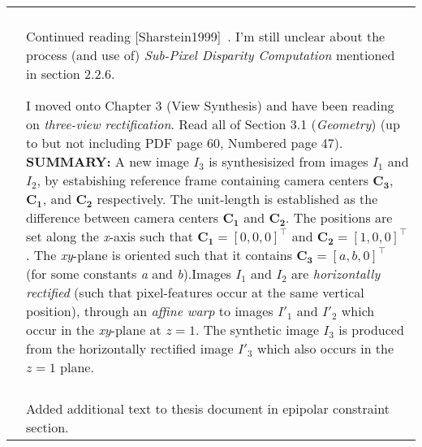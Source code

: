 \documentclass[a4paper,10pt]{article}
\newcommand{\logentry}[4]{\hline\\[-0.25ex]\selectlanguage{USenglish}\formatdate{#2}{#1}{#3}&{#4}\par\\[-0.25ex]}
\newcommand{\SUMMARY}[1]{%
	{\noindent\textbf{\color{blue}SUMMARY: }{\noindent #1} \noindent}
}
\begin{document}
\begin{longtable}{l p{12cm} }
{		}
	\logentry{6}{22}{2016}{%
Continued reading [Sharstein1999]~\cite{Scharstein1999}. I'm still unclear about the process (and use of) \textit{Sub-Pixel Disparity Computation} mentioned in section 2.2.6.\newline
\par I moved onto Chapter 3 (View Synthesis) and have been reading on \textit{three-view rectification}. Read all of Section 3.1 (\textit{Geometry}) (up to but not including PDF page 60, Numbered page 47). \SUMMARY{A new image $I_3$ is synthesisized from images $I_1$ and $I_2$, by estabishing reference frame containing camera centers $\mathbf{C_3}$, $\mathbf{C_1}$, and $\mathbf{C_2}$ respectively. The unit-length is established as the difference between camera centers $\mathbf{C_1}$ and $\mathbf{C_2}$. The positions are set along the \textit{x}-axis such that $\mathbf{C_1}=[0,0,0]^\top$ and $\mathbf{C_2}=[1,0,0]^\top$. The \textit{xy}-plane is oriented such that it contains $\mathbf{C_3}=[a,b,0]^\top$ (for some constants \textit{a} and \textit{b}).Images $I_1$ and $I_2$ are \textit{horizontally rectified} (such that pixel-features occur at the same vertical position), through an \textit{affine warp} to images $I'_1$ and $I'_2$ which occur in the \textit{xy}-plane at $z=1$. The synthetic image $I_3$ is produced from the horizontally rectified image $I'_3$ which also occurs in the $z=1$ plane.
}
	}
	\logentry{6}{24}{2016}{%
Added additional text to thesis document in epipolar constraint section.
	}
	\end{longtable}

	\newpage


	{}
	
\end{document}
